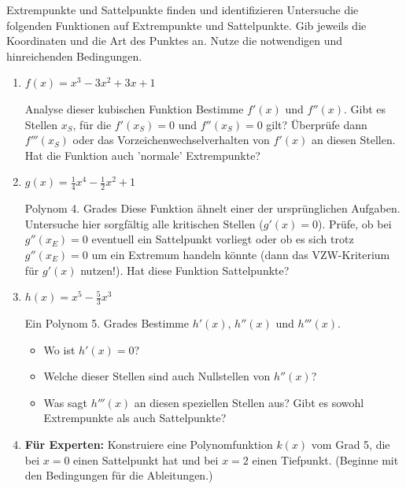 \begin{aufgabenumgebung}{Extrempunkte und Sattelpunkte finden und identifizieren}
Untersuche die folgenden Funktionen auf Extrempunkte und Sattelpunkte. Gib jeweils die Koordinaten und die Art des Punktes an. Nutze die notwendigen und hinreichenden Bedingungen.

\begin{enumerate}
    \item $f(x) = x^3 - 3x^2 + 3x + 1$
        \begin{tippumgebung}{Analyse dieser kubischen Funktion}
        Bestimme $f'(x)$ und $f''(x)$. Gibt es Stellen $x_S$, für die $f'(x_S)=0$ und $f''(x_S)=0$ gilt? Überprüfe dann $f'''(x_S)$ oder das Vorzeichenwechselverhalten von $f'(x)$ an diesen Stellen. Hat die Funktion auch 'normale' Extrempunkte?
        \end{tippumgebung}

    \item $g(x) = \frac{1}{4}x^4 - \frac{1}{2}x^2 + 1$
        \begin{tippumgebung}{Polynom 4. Grades}
        Diese Funktion ähnelt einer der ursprünglichen Aufgaben. Untersuche hier sorgfältig alle kritischen Stellen ($g'(x)=0$). Prüfe, ob bei $g''(x_E)=0$ eventuell ein Sattelpunkt vorliegt oder ob es sich trotz $g''(x_E)=0$ um ein Extremum handeln könnte (dann das VZW-Kriterium für $g'(x)$ nutzen!). Hat diese Funktion Sattelpunkte?
        \end{tippumgebung}

    \item $h(x) = x^5 - \frac{5}{3}x^3$
        \begin{tippumgebung}{Ein Polynom 5. Grades}
        Bestimme $h'(x)$, $h''(x)$ und $h'''(x)$.
        \begin{itemize}
            \item Wo ist $h'(x)=0$?
            \item Welche dieser Stellen sind auch Nullstellen von $h''(x)$?
            \item Was sagt $h'''(x)$ an diesen speziellen Stellen aus? Gibt es sowohl Extrempunkte als auch Sattelpunkte?
        \end{itemize}
        \end{tippumgebung}

    \item \textbf{Für Experten:} Konstruiere eine Polynomfunktion $k(x)$ vom Grad 5, die bei $x=0$ einen Sattelpunkt hat und bei $x=2$ einen Tiefpunkt. (Beginne mit den Bedingungen für die Ableitungen.)
\end{enumerate}
\end{aufgabenumgebung}

